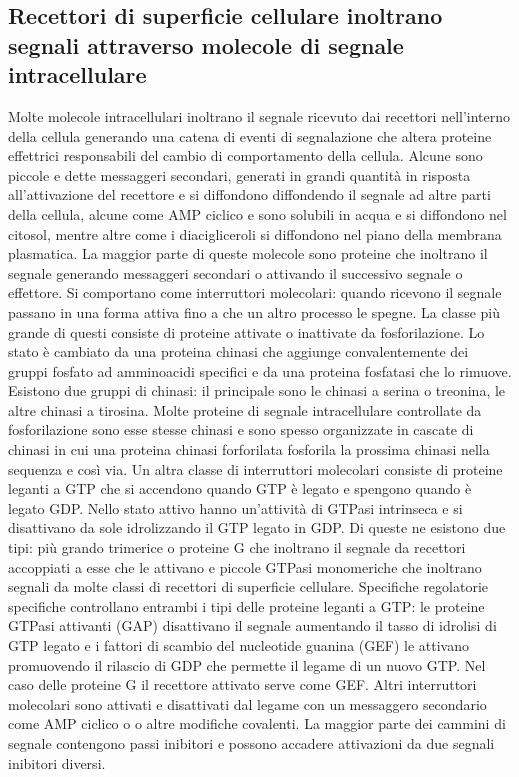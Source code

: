\subsection{Recettori di superficie cellulare inoltrano segnali attraverso molecole di segnale intracellulare}
Molte molecole intracellulari inoltrano il segnale ricevuto dai recettori nell'interno della cellula generando una catena di eventi di segnalazione che altera proteine effettrici 
responsabili del cambio di comportamento della cellula. Alcune sono piccole e dette messaggeri secondari, generati in grandi quantit\`a in risposta all'attivazione del recettore e 
si diffondono diffondendo il segnale ad altre parti della cellula, alcune come AMP ciclico e  sono solubili in acqua e si diffondono nel citosol, mentre altre come i 
diacigliceroli si diffondono nel piano della membrana plasmatica. La maggior parte di queste molecole sono proteine che inoltrano il segnale generando messaggeri secondari o attivando
il successivo segnale o effettore. Si comportano come interruttori molecolari: quando ricevono il segnale passano in una forma attiva fino a che un altro processo le spegne. La classe 
pi\`u grande di questi consiste di proteine attivate o inattivate da fosforilazione. Lo stato \`e cambiato da una proteina chinasi che aggiunge convalentemente dei gruppi fosfato ad
amminoacidi specifici e da una proteina fosfatasi che lo rimuove. Esistono due gruppi di chinasi: il principale sono le chinasi a serina o treonina, le altre chinasi a tirosina. Molte
proteine di segnale intracellulare controllate da fosforilazione sono esse stesse chinasi e sono spesso organizzate in cascate di chinasi in cui una proteina chinasi forforilata 
fosforila la prossima chinasi nella sequenza e cos\`i via. Un altra classe di interruttori molecolari consiste di proteine leganti a GTP che si accendono quando GTP \`e legato e 
spengono quando \`e legato GDP. Nello stato attivo hanno un'attivit\`a di GTPasi intrinseca e si disattivano da sole idrolizzando il GTP legato in GDP. Di queste ne esistono due tipi:
pi\`u grando trimerice o proteine G che inoltrano il segnale da recettori accoppiati a esse che le attivano e piccole GTPasi monomeriche che inoltrano segnali da molte classi di 
recettori di superficie cellulare. Specifiche regolatorie specifiche controllano entrambi i tipi delle proteine leganti a GTP: le proteine GTPasi attivanti (GAP) disattivano il segnale
aumentando il tasso di idrolisi di GTP legato e i fattori di scambio del nucleotide guanina (GEF) le attivano promuovendo il rilascio di GDP che permette il legame di un nuovo GTP. Nel
caso delle proteine G il recettore attivato serve come GEF. Altri interruttori molecolari sono attivati e disattivati dal legame con un messaggero secondario come AMP ciclico o 
 o altre modifiche covalenti. La maggior parte dei cammini di segnale contengono passi inibitori e possono accadere attivazioni da due segnali inibitori diversi. 
